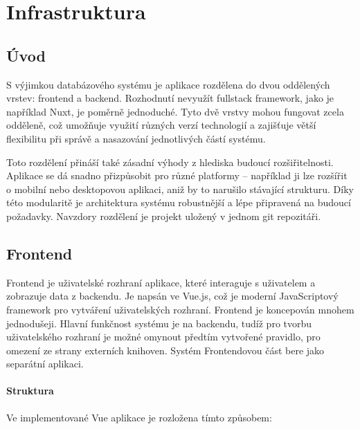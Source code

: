 \chapter{Infrastruktura}

\section{Úvod}
S výjimkou databázového systému je aplikace rozdělena do dvou oddělených vrstev: frontend a backend. Rozhodnutí nevyužít fullstack framework, jako je například Nuxt, je poměrně jednoduché. Tyto dvě vrstvy mohou fungovat zcela odděleně, což umožňuje využití různých verzí technologií a zajišťuje větší flexibilitu při správě a nasazování jednotlivých částí systému.

Toto rozdělení přináší také zásadní výhody z hlediska budoucí rozšiřitelnosti. Aplikace se dá snadno přizpůsobit pro různé platformy – například ji lze rozšířit o mobilní nebo desktopovou aplikaci, aniž by to narušilo stávající strukturu. Díky této modularitě je architektura systému robustnější a lépe připravená na budoucí požadavky. Navzdory rozdělení je projekt uložený v jednom git repozitáři.





\section{Frontend}
Frontend je uživatelské rozhraní aplikace, které interaguje s uživatelem a zobrazuje data z backendu. Je napsán ve Vue.js, což je moderní JavaScriptový framework pro vytváření uživatelských rozhraní. Frontend je koncepován mnohem jednodušeji. Hlavní funkčnost systému je na backendu, tudíž pro tvorbu uživatelského rozhraní je možné omynout předtím vytvořené pravidlo, pro omezení ze strany externích knihoven. Systém Frontendovou část bere jako separátní aplikaci.

\subsubsection{Struktura}
Ve implementované Vue aplikace je rozložena tímto způsobem:



